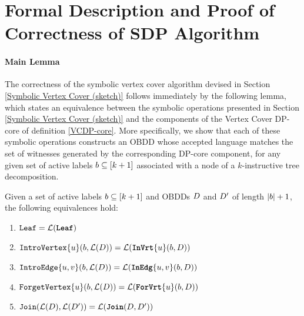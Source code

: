 

\section{Formal Description and Proof of Correctness of SDP Algorithm}\label{app:ProofofSDP-core}

\paragraph*{Main Lemma}

The correctness of the symbolic vertex cover algorithm devised in Section \ref{Symbolic Vertex Cover (sketch)} follows immediately by the following lemma, which states an equivalence between the symbolic operations presented in Section \ref{Symbolic Vertex Cover (sketch)} and the components of the {\sc Vertex Cover} DP-core of definition \ref{VCDP-core}. More specifically, we show that each of these symbolic operations constructs an OBDD whose accepted language matches the set of witnesses generated by the corresponding DP-core component, for any given set of active labels $b \subseteq [k+1]$ associated with a node of a $k$-instructive tree decomposition.

\begin{lemma}
\label{lemma:mainLemma}
    Given a set of active labels $b \subseteq [k+1]$ and OBDDs $D$ and $D'$ of length $|b|+1$, the following equivalences hold:
\begin{enumerate}[label=\arabic*.,left=0pt,labelsep=2pt]
\item \label{mainLeaf} $\texttt{Leaf} = \mathcal{L}(\texttt{\textbf{Leaf}})$
\item \label{mainIntroVertex} $\texttt{IntroVertex}\{u\}(b, \mathcal{L}(D)) = \mathcal{L}(\texttt{\textbf{InVrt}}\{u\}(b,D))$
\item \label{mainIntroEdge}$\texttt{IntroEdge}\{u,v\}(b,\mathcal{L}(D)) = \mathcal{L}(\texttt{\textbf{InEdg}}\{u,v\}(b,D))$
\item \label{mainForgetVertex} $\texttt{ForgetVertex}\{u\}(b,\mathcal{L}(D)) = \mathcal{L}(\texttt{\textbf{ForVrt}}\{u\}(b,D))$
\item \label{mainJoin} $\texttt{Join}(\mathcal{L}(D),\mathcal{L}(D')) = \mathcal{L}(\texttt{\textbf{Join}}(D,D'))$
\end{enumerate}
\end{lemma}

